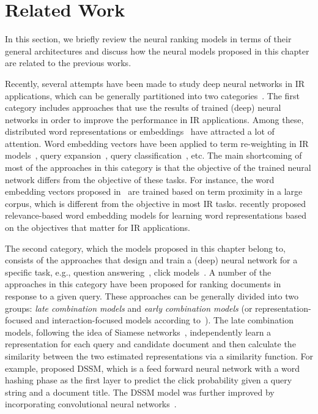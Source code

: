 \section{Related Work}
In this section, we briefly review the neural ranking models in terms of their general architectures and discuss how the neural models proposed in this chapter are related to the previous works.

Recently, several attempts have been made to study deep neural networks in IR applications, which can be generally partitioned into two categories~\citep{guo2019deep, Onal:2016, Zhang:2016}. 
The first category includes approaches that use the results of trained (deep) neural networks in order to improve the performance in IR applications. Among these, distributed word representations or embeddings~\citep{Mikolov:2013,Pennington:2014} have attracted a lot of attention. Word embedding vectors have been applied to term re-weighting in IR models~\citep{Zheng:2015}, query expansion~\citep{Diaz:2016,Zamani:2016a}, query classification~\citep{Liu:2015,Zamani:2016b},  etc. 
The main shortcoming of most of the approaches in this category is that the objective of the trained neural network differs from the objective of these tasks.  For instance, the word embedding vectors proposed in~\citep{Mikolov:2013,Pennington:2014} are trained based on term proximity in a large corpus, which is different from the objective in most IR tasks. \citet{Zamani:2017} recently proposed relevance-based word embedding models for learning word representations based on the objectives that matter for IR applications.

The second category, which the models proposed in this chapter belong to, consists of the approaches that design and train a (deep) neural network for a specific task, e.g., question answering~\citep{Cohen:2016,Yang:2016}, click models~\citep{Borisov:2016}.
A number of the approaches in this category have been proposed for ranking documents in response to a given query.
These approaches can be generally divided into two groups: \emph{late combination models} and \emph{early combination models} (or representation-focused and interaction-focused models according to~\citep{Guo:2016}). 
The late combination models, following the idea of Siamese networks~\citep{Bromley:1993}, independently learn a representation for each query and candidate document and then calculate the similarity between the two estimated representations via a similarity function. For example, \citet{Huang:2013} proposed DSSM, which is a feed forward neural network with a word hashing phase as the first layer to predict the click probability given a query string and a document title. 
The DSSM model was further improved by incorporating convolutional neural networks~\citep{Shen:2014}.

